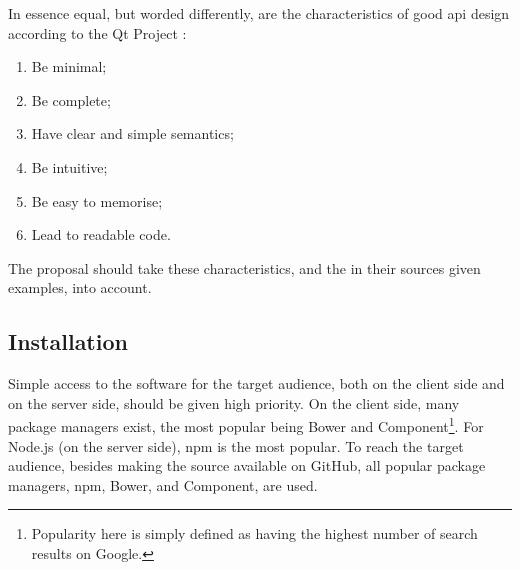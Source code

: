\noindent In essence equal, but worded differently, are the characteristics
  of good \gls{api} design according to the Qt Project
  \autocite*{qt-project.org-api-design-principles}:

\begin{enumerate}
\item Be minimal;
\item Be complete;
\item Have clear and simple semantics;
\item Be intuitive;
\item Be easy to memorise;
\item Lead to readable code.
\end{enumerate}

\noindent The proposal should take these characteristics, and the in their
  sources given examples, into account.

\subsection{Installation}\label{installation}

Simple access to the software for the target audience, both on the client
  side and on the server side, should be given high priority.
On the client side, many package managers exist, the most
  popular being Bower and Component\footnote{Popularity here is simply
    defined as having the highest number of search results on Google.}.
For Node.js (on the server side), \gls{npm} is the most popular.
To reach the target audience, besides making the source available on GitHub,
  all popular package managers, \gls{npm}, Bower, and Component, are used.
